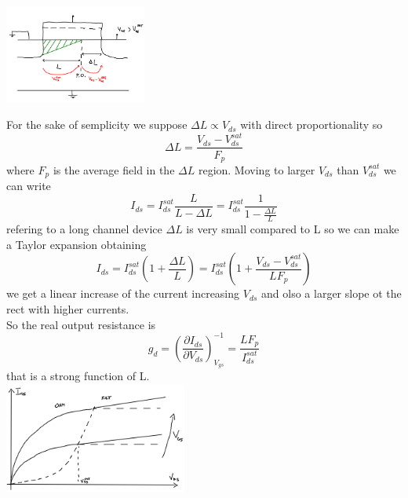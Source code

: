 \centering
\includegraphics[width=0.35\textwidth]{early.png}\\
\raggedright

For the sake of semplicity we suppose $\Delta L\propto V_{ds}$ with direct proportionality so
\begin{equation}
\Delta L =\frac{V_{ds}-V_{ds}^{sat}}{F_p}
\end{equation}
where $F_p$ is the average field in the $\Delta L$ region. Moving to larger $V_{ds}$ than $V_{ds}^{sat}$ we can write 
\begin{equation}
I_{ds}=I_{ds}^{sat}\frac{L}{L-\Delta L }=I_{ds}^{sat}\frac{1}{1-\frac{\Delta L}{L}} 
\end{equation}
refering to a long channel device $\Delta L$ is very small compared to L so we can make a Taylor expansion obtaining 
\begin{equation}
I_{ds}=I_{ds}^{sat}(1+\frac{\Delta L}{L})=I_{ds}^{sat}(1+\frac{V_{ds}-V_{ds}^{sat}}{LF_p})
\end{equation}
we get a linear increase of the current increasing $V_{ds}$ and olso a larger slope ot the rect with higher currents.\\
So the real output resistance is 
\begin{equation}
g_d=\left(\frac{\partial I_{ds}}{\partial V_{ds}}\right)^{-1}_{V_{gs}}=\frac{LF_p}{I_{ds}^{sat}}
\end{equation}
that is a strong function of L.\\

\centering
\includegraphics[width=0.45\textwidth]{early1.png}\\
\raggedright

